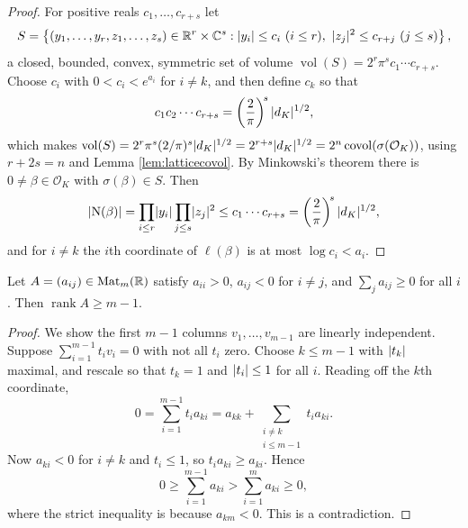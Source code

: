 \documentclass[a4paper]{scrartcl}
\renewcommand{\OO}{\mathcal{O}}
\newcommand{\Nm}{\operatorname{N}}
\newcommand{\vol}{\operatorname{vol}}
\newcommand{\covol}{\operatorname{covol}}
\newcommand{\rank}{\operatorname{rank}}
\begin{document}
\begin{proof}
	For positive reals $c_1,\dots,c_{r+s}$ let
	$$S = \left\{(y_1,\dots,y_r,z_1,\dots,z_s) \in \mathbb{R}^r\times\mathbb{C}^s : \lvert y_i\rvert\le c_i \ (i\le r),\ \lvert z_j\rvert^2\le c_{r+j}\ (j \le s)\right\},$$
	a closed, bounded, convex, symmetric set of volume $\vol(S) = 2^r\pi^sc_1\cdots c_{r+s}$. Choose $c_i$ with $0 < c_i < e^{a_i}$ for $i \neq k$, and then define $c_k$ so that
	$$c_1c_2\cdots c_{r+s} = \left(\frac2\pi\right)^{\!s}\lvert d_K\rvert^{1/2},$$
	which makes $\vol(S) = 2^r\pi^s(2/\pi)^s\abs{d_K}^{1/2} = 2^{r+s}\abs{d_K}^{1/2} = 2^n\covol(\sigma(\OO_K))$, using $r+2s = n$ and Lemma \ref{lem:latticecovol}. By Minkowski's theorem there is $0 \neq \beta \in \OO_K$ with $\sigma(\beta)\in S$. Then
	$$\abs{\Nm(\beta)} = \prod_{i\le r}\abs{y_i}\prod_{j\le s}\abs{z_j}^2 \le c_1\cdots c_{r+s} = \left(\frac2\pi\right)^{\!s}\abs{d_K}^{1/2},$$
	and for $i \neq k$ the $i$th coordinate of $\ell(\beta)$ is at most $\log c_i < a_i$.
\end{proof}

\begin{lemma}\label{lem:rank}
	Let $A = (a_{ij}) \in \mathrm{Mat}_{m}(\mathbb{R})$ satisfy $a_{ii} > 0$, $a_{ij} < 0$ for $i \neq j$, and $\sum_j a_{ij} \geq 0$ for all $i$. Then $\rank A \geq m-1$.
\end{lemma}

\begin{proof}
	We show the first $m-1$ columns $v_1,\dots,v_{m-1}$ are linearly independent. Suppose $\sum_{i=1}^{m-1}t_iv_i = 0$ with not all $t_i$ zero. Choose $k \le m-1$ with $\lvert t_k\rvert$ maximal, and rescale so that $t_k = 1$ and $\lvert t_i\rvert\le1$ for all $i$. Reading off the $k$th coordinate,
	$$0 = \sum_{i=1}^{m-1}t_ia_{ki} = a_{kk} + \sum_{\substack{i \neq k\\ i \le m-1}}t_ia_{ki}.$$
	Now $a_{ki} < 0$ for $i \neq k$ and $t_i \le 1$, so $t_ia_{ki} \ge a_{ki}$. Hence
	$$0 \geq \sum_{i=1}^{m-1}a_{ki} > \sum_{i=1}^{m}a_{ki} \geq 0,$$
	where the strict inequality is because $a_{km} < 0$. This is a contradiction.
\end{proof}
\end{document}
